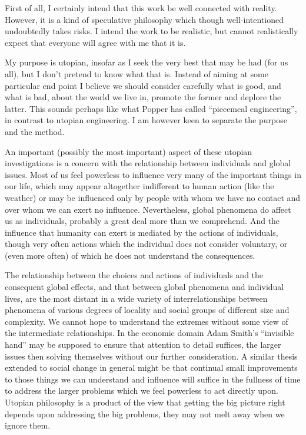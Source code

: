First of all, I certainly intend that this work be well connected with reality.
However, it is a kind of speculative philosophy which though well-intentioned undoubtedly takes risks.
I intend the work to be realistic, but cannot realistically expect that everyone will agree with me that it is.

My purpose is utopian, insofar as I seek the very best that may be had (for us all), but I don't pretend to know what that is.
Instead of aiming at some particular end point I believe we should consider carefully what is good, and what is bad, about the world we live in, promote the former and deplore the latter.
This sounds perhaps like what Popper has called ``piecemeal engineering'', in contrast to utopian engineering.
I am however keen to separate the purpose and the method.

An important (possibly the most important) aspect of these utopian investigations is a concern with the relationship between individuals and global issues.
Most of us feel powerless to influence very many of the important things in our life, which may appear altogether indifferent to human action (like the weather) or may be influenced only by people with whom we have no contact and over whom we can exert no influence.
Nevertheless, global phenomena do affect us as individuals, probably a great deal more than we comprehend.
And the influence that humanity can exert is mediated by the actions of individuals, though very often actions which the individual does not consider voluntary, or (even more often) of which he does not understand the consequences.

The relationship between the choices and actions of individuals and the consequent global effects, and that between global phenomena and individual lives, are the most distant in a wide variety of interrelationships between phenomena of various degrees of locality and social groups of different size and complexity.
We cannot hope to understand the extremes without some view of the intermediate relationships.
In the economic domain Adam Smith's ``invisible hand'' may be supposed to ensure that attention to detail suffices, the larger issues then solving themselves without our further consideration.
A similar thesis extended to social change in general might be that continual small improvements to those things we can understand and influence will suffice in the fullness of time to address the larger problems which we feel powerless to act directly upon.
Utopian philosophy is a product of the view that getting the big picture right depends upon addressing the big problems, they may not melt away when we ignore them.

